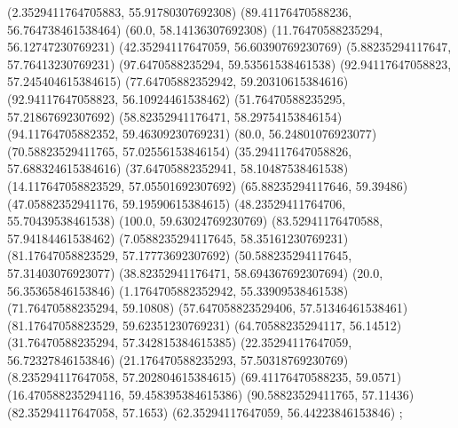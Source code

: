 {{{		(2.3529411764705883, 55.91780307692308)
		(89.41176470588236, 56.764738461538464)
		(60.0, 58.14136307692308)
		(11.76470588235294, 56.12747230769231)
		(42.35294117647059, 56.60390769230769)
		(5.88235294117647, 57.76413230769231)
		(97.6470588235294, 59.53561538461538)
		(92.94117647058823, 57.245404615384615)
		(77.64705882352942, 59.20310615384616)
		(92.94117647058823, 56.10924461538462)
		(51.76470588235295, 57.21867692307692)
		(58.82352941176471, 58.29754153846154)
		(94.11764705882352, 59.46309230769231)
		(80.0, 56.24801076923077)
		(70.58823529411765, 57.02556153846154)
		(35.294117647058826, 57.688324615384616)
		(37.64705882352941, 58.10487538461538)
		(14.117647058823529, 57.05501692307692)
		(65.88235294117646, 59.39486)
		(47.05882352941176, 59.19590615384615)
		(48.23529411764706, 55.70439538461538)
		(100.0, 59.63024769230769)
		(83.52941176470588, 57.94184461538462)
		(7.0588235294117645, 58.35161230769231)
		(81.17647058823529, 57.17773692307692)
		(50.588235294117645, 57.31403076923077)
		(38.82352941176471, 58.694367692307694)
		(20.0, 56.35365846153846)
		(1.1764705882352942, 55.33909538461538)
		(71.76470588235294, 59.10808)
		(57.647058823529406, 57.51346461538461)
		(81.17647058823529, 59.62351230769231)
		(64.70588235294117, 56.14512)
		(31.76470588235294, 57.342815384615385)
		(22.35294117647059, 56.72327846153846)
		(21.176470588235293, 57.50318769230769)
		(8.235294117647058, 57.202804615384615)
		(69.41176470588235, 59.0571)
		(16.470588235294116, 59.458395384615386)
		(90.58823529411765, 57.11436)
		(82.35294117647058, 57.1653)
		(62.35294117647059, 56.44223846153846)
	};

}}
